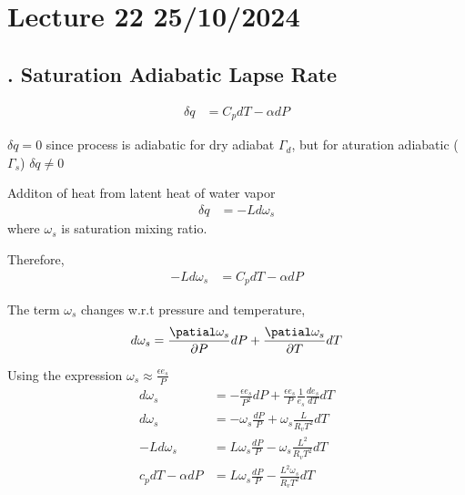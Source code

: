 \documentclass[fleqn,10pt]{SelfArx} %
\begin{document}
\clearpage

\section{Lecture 22 25/10/2024}
\subsection{. Saturation Adiabatic Lapse Rate }
\begin{align}
    \delta q &= C_p dT - \alpha dP
\end{align}

$\delta q =0$ since process is adiabatic for dry adiabat $\Gamma_d$, but for aturation adiabatic ($\Gamma_s$) $\delta q \neq 0$

Additon of heat from latent heat of water vapor 
\begin{align}
    \delta q &= -Ld\omega_s
\end{align}
where $\omega_s$ is saturation mixing ratio.

Therefore,
\begin{align}
    -Ld\omega_s &= C_pdT - \alpha dP
\end{align}

The term $\omega_s$ changes w.r.t pressure and temperature,
\begin{align}
    d\omega_s = \frac{\patial \omega_s}{\partial P} dP +  \frac{\patial \omega_s}{\partial T} dT
\end{align}

Using the expression $\omega_s \approx \frac{\epsilon e_s}{P}$
\begin{align}
    d\omega_s &= -\frac{\epsilon e_s}{P^2} dP + \frac{\epsilon e_s}{P} \frac{1}{e_s}\frac{de_s}{dT}dT \\
    d\omega_s &= -\omega_s \frac{dP}{P} + \omega_s \frac{L}{R_v T^2}dT \\
    -Ld\omega_s &= L\omega_s\frac{dP}{P} - \omega_s \frac{L^2}{R_v T^2}dT \\
    c_pdT - \alpha dP &= L\omega_s \frac{dP}{P} - \frac{L^2\omega_s}{R_vT^2}dT
\end{align}
\end{document}
